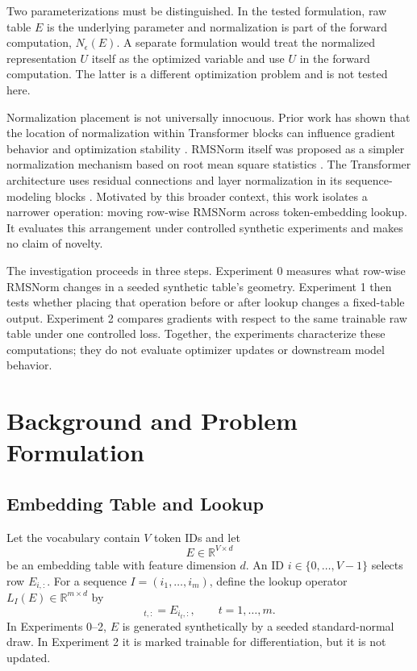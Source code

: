 \documentclass[conference]{IEEEtran}
\begin{document}
Two parameterizations must be distinguished. In the tested formulation, raw table \(E\) is the underlying parameter and normalization is part of the forward computation, \(N_{\epsilon}(E)\). A separate formulation would treat the normalized representation \(U\) itself as the optimized variable and use \(U\) in the forward computation. The latter is a different optimization problem and is not tested here.

Normalization placement is not universally innocuous. Prior work has shown that the location of normalization within Transformer blocks can influence gradient behavior and optimization stability \cite{xiong2020layernorm}. RMSNorm itself was proposed as a simpler normalization mechanism based on root mean square statistics \cite{zhang2019rmsnorm}. The Transformer architecture uses residual connections and layer normalization in its sequence-modeling blocks \cite{vaswani2017attention}. Motivated by this broader context, this work isolates a narrower operation: moving row-wise RMSNorm across token-embedding lookup. It evaluates this arrangement under controlled synthetic experiments and makes no claim of novelty.

The investigation proceeds in three steps. Experiment 0 measures what row-wise RMSNorm changes in a seeded synthetic table's geometry. Experiment 1 then tests whether placing that operation before or after lookup changes a fixed-table output. Experiment 2 compares gradients with respect to the same trainable raw table under one controlled loss. Together, the experiments characterize these computations; they do not evaluate optimizer updates or downstream model behavior.

\section{Background and Problem Formulation}
\subsection{Embedding Table and Lookup}
Let the vocabulary contain \(V\) token IDs and let
\begin{equation}
E\in\mathbb{R}^{V\times d}
\label{eq:table}
\end{equation}
be an embedding table with feature dimension \(d\). An ID \(i\in\{0,\ldots,V-1\}\) selects row \(E_{i,:}\). For a sequence \(I=(i_1,\ldots,i_m)\), define the lookup operator \(L_I(E)\in\mathbb{R}^{m\times d}\) by
\begin{equation}
[L_I(E)]_{t,:}=E_{i_t,:},\qquad t=1,\ldots,m.
\label{eq:lookup}
\end{equation}
In Experiments 0--2, \(E\) is generated synthetically by a seeded standard-normal draw. In Experiment 2 it is marked trainable for differentiation, but it is not updated.
\end{document}

